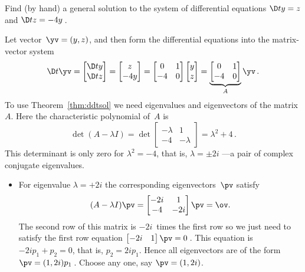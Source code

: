 \begin{example} \label{eg:decis2t} 
Find (by hand) a general solution to the system of differential equations
\(\D ty=z\) and \(\D tz=-4y\)\,.
\begin{solution} 
Let vector~\(\yv=(y,z)\), and then form the differential equations into the matrix-vector system
\begin{equation*}
\D t\yv=\begin{bmatrix} \D ty\\\D tz \end{bmatrix}
=\begin{bmatrix} z\\-4y \end{bmatrix}
=\begin{bmatrix} 0&1\\-4&0 \end{bmatrix}
\begin{bmatrix} y\\z \end{bmatrix}
=\underbrace{\begin{bmatrix} 0&1\\-4&0 \end{bmatrix}}_A\yv\,.
\end{equation*}
To use Theorem~\ref{thm:ddtsol} we need eigenvalues and eigenvectors of the matrix~\(A\).
Here the characteristic polynomial of~\(A\) is
\begin{equation*}
\det(A-\lambda I)=\det\begin{bmatrix} -\lambda&1\\-4&-\lambda \end{bmatrix}
=\lambda^2+4\,.
\end{equation*}
This determinant is only zero for \(\lambda^2=-4\), that is, \(\lambda=\pm2i\) ---a pair of complex conjugate eigenvalues.
\begin{itemize}
\item For eigenvalue \(\lambda=+2i\) the corresponding eigenvectors~\(\pv\) satisfy
\begin{equation*}
(A-\lambda I)\pv=\begin{bmatrix} -2i&1\\-4&-2i \end{bmatrix}\pv
=\ov.
\end{equation*}
The second row of this matrix is \(-2i\)~times the first row so we just need to satisfy the first row equation \(\begin{bmatrix} -2i&1 \end{bmatrix}\pv=0\)\,.
This equation is \(-2ip_1+p_2=0\), that is, \(p_2=2ip_1\).
Hence all eigenvectors are of the form \(\pv=(1,2i)p_1\)\,.
Choose any one, say \(\pv=(1,2i)\).


\end{itemize}
\end{solution}
\end{example}
